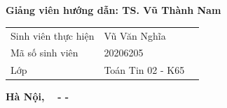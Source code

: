 \begin{titlepage}
\begin{center}
\textbf{\fontsize{16pt}{30pt}\selectfont {ĐỀ TÀI:}} \\


\textbf{\fontsize{20pt}{24pt}\selectfont {Sử dụng thiết kế hướng miền \\ xây dựng kiến trúc vi dịch vụ cho \\ bài toán hóa đơn điện tử}} \\

\end{center}

\vspace{0.7cm}

\hspace{2.4cm}\begin{minipage}{0.8\textwidth}

\textbf{Giảng viên hướng dẫn: TS. Vũ Thành Nam}

\end{minipage}

\vspace{0.7cm}

\hspace{3cm}\begin{minipage}{0.7\textwidth}

\begin{tabular}{l l l}

Sinh viên thực hiện & Vũ Văn Nghĩa \\

Mã số sinh viên & 20206205 \\

Lớp & Toán Tin 02 - K65 \\

\end{tabular}

\end{minipage}

\vspace{0.5cm}

\begin{center}

\textbf{Hà Nội, \the\month~ - - ~\the\year}

\end{center}

\end{titlepage}

